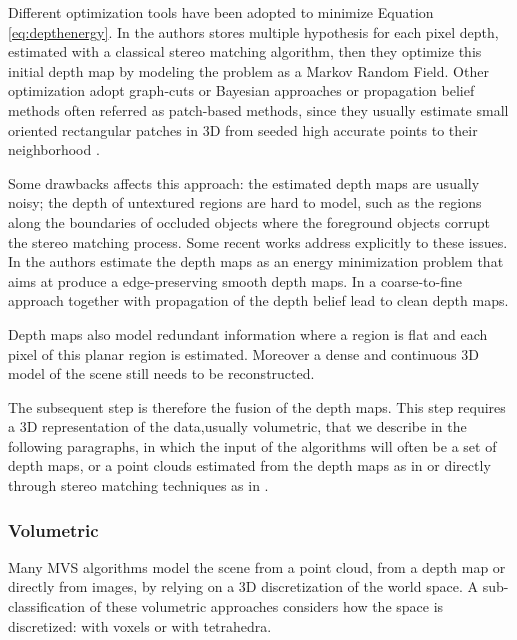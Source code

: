 Different optimization tools have been adopted to minimize Equation \eqref{eq:depthenergy}. In \cite{campbell2008using} the authors stores multiple hypothesis for each pixel depth, estimated with a classical stereo matching algorithm, then they optimize this initial depth map by modeling the problem as a Markov Random Field. Other optimization adopt graph-cuts \cite{kolmogorov2002multi} or Bayesian approaches \cite{strecha2006combined,gargallo2005bayesian} or propagation belief methods often referred as patch-based methods, since they usually estimate small oriented rectangular patches in 3D from seeded high accurate points to their neighborhood \cite{fu10,goesele2007multi,Tola12,bleyer2011patchmatch,heise2013pm}.




Some drawbacks affects this approach: the estimated depth maps are usually noisy; the depth of untextured regions are hard to model, such as the regions along the boundaries of occluded objects where the foreground objects corrupt the stereo matching process.
Some recent works address explicitly to these issues. 
In \cite{semerjian2014new} the authors estimate the depth maps as an energy minimization problem that aims at produce a edge-preserving smooth depth maps.
In \cite{wei2014multi} a coarse-to-fine approach together with propagation of the depth belief lead to clean depth maps.

Depth maps also model redundant information where a region is flat and each pixel of this planar region is estimated. 
Moreover a dense and continuous 3D model of the scene still needs to be reconstructed.

The subsequent step is therefore the fusion of the depth maps.
This step requires a 3D representation of the data,usually volumetric, that we describe in the following paragraphs, in which the input of the algorithms will often be a set of depth maps, or a point clouds estimated from the depth maps  as in \cite{curless1996volumetric} or directly through stereo matching techniques as in \cite{bradley2008accurate,labatut2007efficient,vu_et_al_2012}.

\subsubsection{Volumetric}
Many MVS algorithms model the scene from a point cloud, from a depth map or directly from images, by relying on a 3D discretization of the world space.
A sub-classification of these volumetric approaches considers how the space is discretized: with voxels or with tetrahedra.


